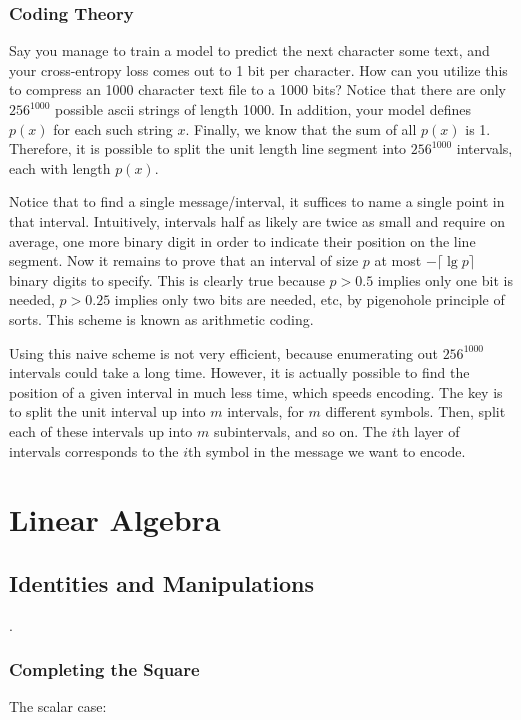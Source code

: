 \documentclass[12pt]{article}
\begin{document}
\subsubsection{Coding Theory}

Say you manage to train a model to predict the next character some text, and your cross-entropy loss comes out to 1 bit per character. How can you utilize this to compress an 1000 character text file to a 1000 bits? Notice that there are only $256^{1000}$ possible ascii strings of length 1000. In addition, your model defines $p(x)$ for each such string $x$. Finally, we know that the sum of all $p(x)$ is 1. Therefore, it is possible to split the unit length line segment into $256^{1000}$ intervals, each with length $p(x)$.

Notice that to find a single message/interval, it suffices to name a single point in that interval. Intuitively, intervals half as likely are twice as small and require on average, one more binary digit in order to indicate their position on the line segment. Now it remains to prove that an interval of size $p$ at most $- \lceil \lg p \rceil$ binary digits to specify. This is clearly true because $p > 0.5$ implies only one bit is needed, $p > 0.25$ implies only two bits are needed, etc, by pigenohole principle of sorts. This scheme is known as arithmetic coding.

Using this naive scheme is not very efficient, because enumerating out $256^{1000}$ intervals could take a long time. However, it is actually possible to find the position of a given interval in much less time, which speeds encoding. The key is to split the unit interval up into $m$ intervals, for $m$ different symbols. Then, split each of these intervals up into $m$ subintervals, and so on. The $i$th layer of intervals corresponds to the $i$th symbol in the message we want to encode.

\section{Linear Algebra}
\subsection{Identities and Manipulations}
.
\subsubsection{Completing the Square}

The scalar case:
\end{document}
